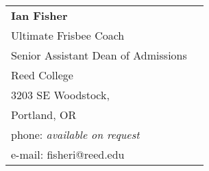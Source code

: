 \documentclass[margin,line]{resume}
\begin{document}
\begin{resume}
\begin{tabular}{@{}p{6cm}p{6cm}}
\textbf{Ian Fisher}     \\
Ultimate Frisbee Coach \\ Senior Assistant Dean of Admissions                    \\
Reed College \\
3203 SE Woodstock, \\ Portland, OR     \\  
phone: \textsl{available on request} \\   
e-mail: fisheri@reed.edu \\ 
\end{tabular}



\end{resume}
\end{document}
